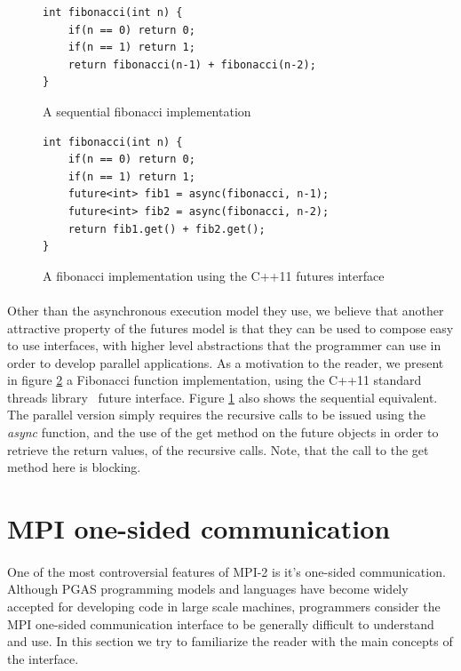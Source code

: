 \begin{figure}[!ht]
\begin{lstlisting}
int	fibonacci(int n) {
	if(n == 0) return 0;
	if(n == 1) return 1;
	return fibonacci(n-1) + fibonacci(n-2);
}
\end{lstlisting}
\caption{A sequential fibonacci implementation}
\label{lst:fib_seq}
\end{figure}

\begin{figure}[!ht]
\begin{lstlisting}
int	fibonacci(int n) {
	if(n == 0) return 0;
	if(n == 1) return 1;
	future<int> fib1 = async(fibonacci, n-1);
	future<int> fib2 = async(fibonacci, n-2);
	return fib1.get() + fib2.get();
}
\end{lstlisting}
\caption{A fibonacci implementation using the C++11 futures interface}
\label{lst:fib_futures}
\end{figure}

\paragraph{}
Other than the asynchronous execution model they use, we believe that another attractive property of the futures model 
is that they can be used to compose easy to use interfaces, with higher level abstractions that the programmer can use 
in order to develop parallel applications.  As a motivation to the reader, we present in figure \ref{lst:fib_futures} a
Fibonacci function implementation, using the C++11 standard threads library~\cite{CPP:Threads} future interface.  Figure
\ref{lst:fib_seq} also shows the sequential equivalent.  The parallel version simply requires the recursive calls 
to be issued using the \emph{async} function, and the use of the get method on the future objects in order to retrieve
the return values, of the recursive calls.  Note, that the call to the get method here is blocking.  


\section{MPI one-sided communication}
\label{sect:mpi-one-sided}
\paragraph{}
One of the most controversial features of MPI-2 is it's one-sided communication.  Although PGAS programming
models and languages have become widely accepted for developing code in large scale machines, programmers
consider the MPI one-sided communication interface to be generally difficult to understand and use.  In this
section we try to familiarize the reader with the main concepts of the interface.  

